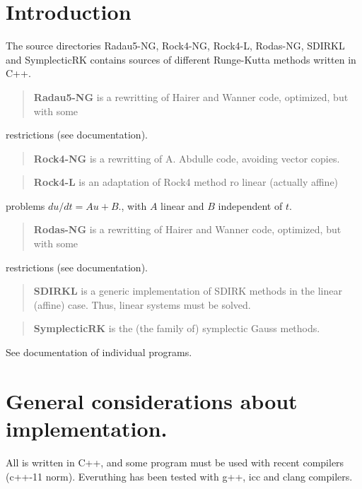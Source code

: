 \hypertarget{index_Introduction}{}\section{Introduction}\label{index_Introduction}
The source directories Radau5-\/\-N\-G, Rock4-\/\-N\-G, Rock4-\/\-L, Rodas-\/\-N\-G, S\-D\-I\-R\-K\-L and Symplectic\-R\-K contains sources of different Runge-\/\-Kutta methods written in C++.

\begin{quotation}
{\bfseries  Radau5-\/\-N\-G } is a rewritting of Hairer and Wanner code, optimized, but with some

\end{quotation}
restrictions (see documentation).

\begin{quotation}
{\bfseries  Rock4-\/\-N\-G } is a rewritting of A. Abdulle code, avoiding vector copies.

\end{quotation}


\begin{quotation}
{\bfseries  Rock4-\/\-L } is an adaptation of Rock4 method ro linear (actually affine)

\end{quotation}
problems $ du/dt= A u +B.$, with $ A $ linear and $ B $ independent of $ t.$

\begin{quotation}
{\bfseries  Rodas-\/\-N\-G } is a rewritting of Hairer and Wanner code, optimized, but with some

\end{quotation}
restrictions (see documentation).

\begin{quotation}
{\bfseries  S\-D\-I\-R\-K\-L} is a generic implementation of S\-D\-I\-R\-K methods in the linear (affine) case. Thus, linear systems must be solved.

\end{quotation}


\begin{quotation}
{\bfseries  Symplectic\-R\-K} is the (the family of) symplectic Gauss methods.

\end{quotation}


See documentation of individual programs.\hypertarget{index_General}{}\section{General considerations about implementation.}\label{index_General}
All is written in C++, and some program must be used with recent compilers (c++-\/11 norm). Everuthing has been tested with g++, icc and clang compilers.

